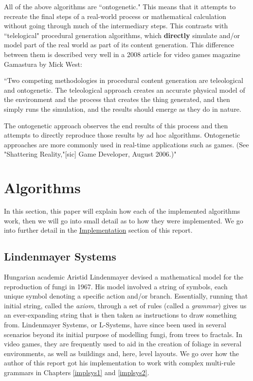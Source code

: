 All of the above algorithms are ``ontogenetic." This means that it attempts to recreate the final steps of a real-world process or mathematical calculation without going through much of the intermediary steps.\cite{pcgwikionto} This contrasts with ``telelogical" procedural generation algorithms, which \textbf{directly} simulate and/or model part of the real world as part of its content generation.\cite{pcgwikitele} This difference between them is described very well in a 2008 article for video games magazine Gamastura by Mick West:

``Two competing methodologies in procedural content generation are teleological and ontogenetic. The teleological approach creates an accurate physical model of the environment and the process that creates the thing generated, and then simply runs the simulation, and the results should emerge as they do in nature.

The ontogenetic approach observes the end results of this process and then attempts to directly reproduce those results by ad hoc algorithms. Ontogenetic approaches are more commonly used in real-time applications such as games. (See "Shattering Reality,"[sic] Game Developer, August 2006.)"\cite{teleonto}\cite{shatteringreality}\cite{randomscattering}

\section{Algorithms}

In this section, this paper will explain how each of the implemented algorithms work, then we will go into small detail as to how they were implemented. We go into further detail in the \hyperref[Implementation]{Implementation} section of this report.

\subsection{Lindenmayer Systems} \label{alglsys}

Hungarian academic Aristid Lindenmayer devised a mathematical model for the reproduction of fungi in 1967.\cite{LINDENMAYER1968300} His model involved a string of symbols, each unique symbol denoting a specific action and/or branch. Essentially, running that initial string, called the \emph{axiom}, through a set of rules (called a \emph{grammar}) gives us an ever-expanding string that is then taken as instructions to draw something from. Lindenmayer Systems, or L-Systems, have since been used in several scenarios beyond its initial purpose of modelling fungi, from trees to fractals. In video games, they are frequently used to aid in the creation of foliage in several environments, as well as buildings and, here, level layouts. We go over how the author of this report got his implementation to work with complex multi-rule grammars in Chapters \ref{implsys1} and \ref{implsys2}.

